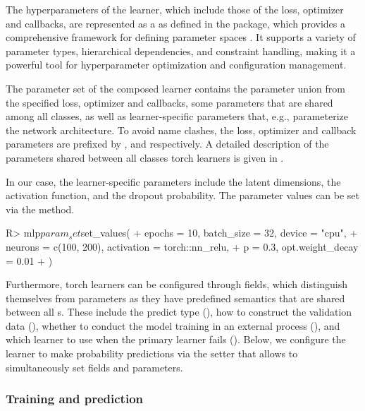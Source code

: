 \documentclass[article]{jss}
\theoremstyle{definition}
\begin{document}
The hyperparameters of the learner, which include those of the loss, optimizer and callbacks, are represented as a  as defined in the  package, which provides a comprehensive framework for defining parameter spaces \citep{ref-paradox2024}.
It supports a variety of parameter types, hierarchical dependencies, and constraint handling, making it a powerful tool for hyperparameter optimization and configuration management.

The parameter set of the composed learner contains the parameter union from the specified loss, optimizer and callbacks, some parameters that are shared among all  classes, as well as learner-specific parameters that, e.g., parameterize the network architecture.
To avoid name clashes, the loss, optimizer and callback parameters are prefixed by ,   and  respectively.
A detailed description of the parameters shared between all classes torch learners is given in .

In our case, the learner-specific parameters include the latent dimensions, the activation function, and the dropout probability.
The parameter values can be set via the  method.

\begin{CodeInput}
R> mlp$param_set$set_values(
+    epochs = 10, batch_size = 32, device = "cpu",
+    neurons = c(100, 200), activation = torch::nn_relu,
+    p = 0.3, opt.weight_decay = 0.01
+  )
\end{CodeInput}

Furthermore, torch learners can be configured through fields, which distinguish themselves from parameters as they have predefined semantics that are shared between all s.
These include the predict type (), how to construct the validation data (), whether to conduct the model training in an external process (), and which learner to use when the primary learner fails ().
Below, we configure the learner to make probability predictions via the setter  that allows to simultaneously set fields and parameters.


\subsubsection{Training and prediction}
\end{document}
